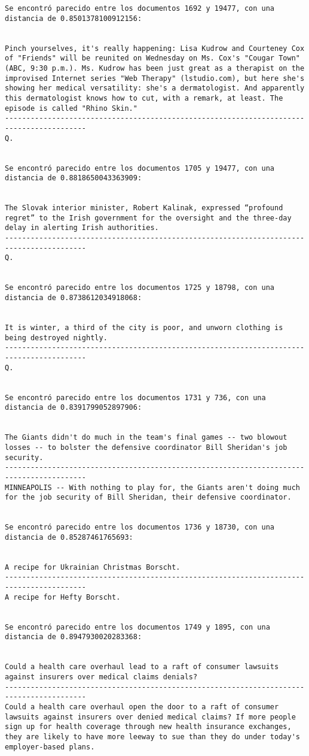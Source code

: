 \documentclass[11pt]{article}
\begin{document}
\begin{Verbatim}[commandchars=\\\{\}]
Se encontró parecido entre los documentos 1692 y 19477, con una distancia de 0.8501378100912156:


Pinch yourselves, it's really happening: Lisa Kudrow and Courteney Cox of "Friends" will be reunited on Wednesday on Ms. Cox's "Cougar Town" (ABC, 9:30 p.m.). Ms. Kudrow has been just great as a therapist on the improvised Internet series "Web Therapy" (lstudio.com), but here she's showing her medical versatility: she's a dermatologist. And apparently this dermatologist knows how to cut, with a remark, at least. The episode is called "Rhino Skin."
-----------------------------------------------------------------------------------------
Q.


Se encontró parecido entre los documentos 1705 y 19477, con una distancia de 0.8818650043363909:


The Slovak interior minister, Robert Kalinak, expressed “profound regret” to the Irish government for the oversight and the three-day delay in alerting Irish authorities.
-----------------------------------------------------------------------------------------
Q.


Se encontró parecido entre los documentos 1725 y 18798, con una distancia de 0.8738612034918068:


It is winter, a third of the city is poor, and unworn clothing is being destroyed nightly.
-----------------------------------------------------------------------------------------
Q.


Se encontró parecido entre los documentos 1731 y 736, con una distancia de 0.8391799052897906:


The Giants didn't do much in the team's final games -- two blowout losses -- to bolster the defensive coordinator Bill Sheridan's job security.
-----------------------------------------------------------------------------------------
MINNEAPOLIS -- With nothing to play for, the Giants aren't doing much for the job security of Bill Sheridan, their defensive coordinator.


Se encontró parecido entre los documentos 1736 y 18730, con una distancia de 0.85287461765693:


A recipe for Ukrainian Christmas Borscht.
-----------------------------------------------------------------------------------------
A recipe for Hefty Borscht.


Se encontró parecido entre los documentos 1749 y 1895, con una distancia de 0.8947930020283368:


Could a health care overhaul lead to a raft of consumer lawsuits against insurers over medical claims denials?
-----------------------------------------------------------------------------------------
Could a health care overhaul open the door to a raft of consumer lawsuits against insurers over denied medical claims? If more people sign up for health coverage through new health insurance exchanges, they are likely to have more leeway to sue than they do under today's employer-based plans.



\end{Verbatim}
\end{document}
